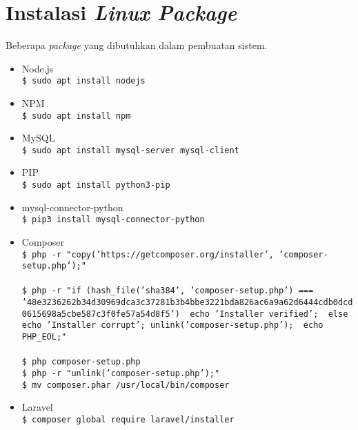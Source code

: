 \section*{Instalasi \textit{Linux Package}}
Beberapa \textit{package} yang dibutuhkan dalam pembuatan sistem.
\begin{itemize}
	\item Node.js \\
		\texttt{\$ sudo apt install nodejs}\\
	\item NPM \\
		\texttt{\$ sudo apt install npm}\\
	\item MySQL \\
		\texttt{\$ sudo apt install mysql-server mysql-client}\\
	\item PIP \\
		\texttt{\$ sudo apt install python3-pip}\\
	\item mysql-connector-python \\
		\texttt{\$ pip3 install mysql-connector-python}\\
	\item Composer \\
		\texttt{\$ php -r "copy('https://getcomposer.org/installer', 'composer-setup.php');"} \\ \\
		\texttt{\$ php -r "if (hash\_file('sha384', 'composer-setup.php') === '48e3236262b34d30969dca3c37281b3b4bbe3221bda826ac6a9a62d6444cdb0dcd0615698a5cbe587c3f0fe57a54d8f5') { echo 'Installer verified'; } else { echo 'Installer corrupt'; unlink('composer-setup.php'); } echo PHP\_EOL;"}\\ \\
		\texttt{\$ php composer-setup.php} \\
		\texttt{\$ php -r "unlink('composer-setup.php');"} \\
		\texttt{\$ mv composer.phar /usr/local/bin/composer} \\
	\item Laravel \\
		\texttt{\$ composer global require laravel/installer}\\
\end{itemize}